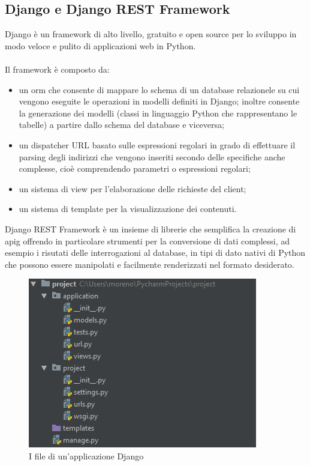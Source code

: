 	\subsection{Django e Django REST Framework}
	\label{tec:django}
	Django è un framework di alto livello, gratuito e open source per lo sviluppo in modo veloce e pulito di applicazioni web in Python.\\ \\
	Il framework è composto da:
	\begin{itemize}
	\item un \gls{orm} che consente di mappare lo schema di un database relazionele su cui vengono eseguite le operazioni in modelli definiti in Django; inoltre consente la generazione dei modelli (classi in linguaggio Python che rappresentano le tabelle) a partire dallo schema del database e viceversa;
	\item un dispatcher URL basato sulle espressioni regolari in grado di effettuare il parsing degli indirizzi che vengono inseriti secondo delle specifiche anche complesse, cioè comprendendo parametri o espressioni regolari;
	\item un sistema di view per l’elaborazione delle richieste del client;
	\item un sistema di template per la visualizzazione dei contenuti.
	\end{itemize}
	
	Django REST Framework è un insieme di librerie che semplifica la creazione di \gls{apig} offrendo in particolare strumenti per la conversione di dati complessi, ad esempio i risutati delle interrogazioni al database, in tipi di dato nativi di Python che possono essere manipolati e facilmente renderizzati nel formato desiderato.\\
	\begin{figure}[H]
		\centering
		\includegraphics[width=0.6\linewidth]{immagini/django-arch}
		\caption{I file di un'applicazione Django}
		\label{fig:django-arch}
	\end{figure}
	

